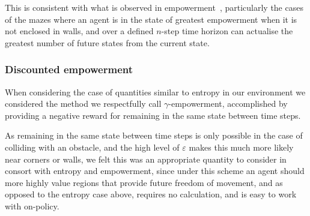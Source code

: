 \documentclass{article}
\begin{document}
This is consistent with what is observed in empowerment~\citep{klyubin2005empowerment}, particularly the cases of the mazes where an agent is in the state of greatest empowerment when it is not enclosed in walls, and over a defined $n$-step time horizon can actualise the greatest number of future states from the current state.

\subsubsection{Discounted empowerment\label{gammares_exp}}
When considering the case of quantities similar to entropy in our environment we considered the method we respectfully call $\gamma$-empowerment, accomplished by providing a negative reward for remaining in the same state between time steps.

As remaining in the same state between time steps is only possible in the case of colliding with an obstacle, and the high level of $\varepsilon$ makes this much more likely near corners or walls, we felt this was an appropriate quantity to consider in consort with entropy and empowerment, since under this scheme an agent should more highly value regions that provide future freedom of movement, and as opposed to the entropy case above, requires no calculation, and is easy to work with on-policy.

%

\end{document}
